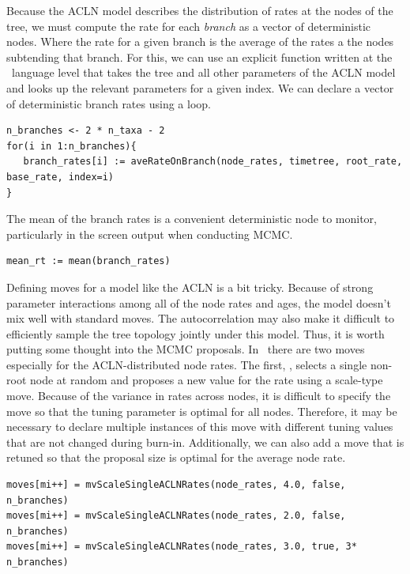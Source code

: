 Because the ACLN model describes the distribution of rates at the nodes of the tree, we must compute the rate for each \textit{branch} as a vector of deterministic nodes. Where the rate for a given branch is the average of the rates a the nodes subtending that branch.
For this, we can use an explicit function written at the \Rev~language level that takes the tree and all other parameters of the ACLN model and looks up the relevant parameters for a given index. 
We can declare a vector of deterministic branch rates using a  loop.
{\tt \begin{snugshade*}
\begin{lstlisting}
n_branches <- 2 * n_taxa - 2
for(i in 1:n_branches){
   branch_rates[i] := aveRateOnBranch(node_rates, timetree, root_rate, base_rate, index=i)
}
\end{lstlisting}
\end{snugshade*}}

The mean of the branch rates is a convenient deterministic node to monitor, particularly in the screen output when conducting MCMC.
{\tt \begin{snugshade*}
\begin{lstlisting}
mean_rt := mean(branch_rates) 
\end{lstlisting}
\end{snugshade*}}

Defining moves for a model like the ACLN is a bit tricky. Because of strong parameter interactions among all of the node rates and ages, the model doesn't mix well with standard moves. 
The autocorrelation may also make it difficult to efficiently sample the tree topology jointly under this model.
Thus, it is worth putting some thought into the MCMC proposals. 
In \RevBayes~there are two moves especially for the ACLN-distributed node rates.
The first, , selects a single non-root node at random and proposes a new value for the rate using a scale-type move. 
Because of the variance in rates across nodes, it is difficult to specify the move so that the tuning parameter is optimal for all nodes. 
Therefore, it may be necessary to declare multiple instances of this move with different tuning values that are not changed during burn-in.
Additionally, we can also add a move that is retuned so that the proposal size is optimal for the average node rate. 
{\tt \begin{snugshade*}
\begin{lstlisting}
moves[mi++] = mvScaleSingleACLNRates(node_rates, 4.0, false, n_branches)
moves[mi++] = mvScaleSingleACLNRates(node_rates, 2.0, false, n_branches)
moves[mi++] = mvScaleSingleACLNRates(node_rates, 3.0, true, 3* n_branches)
\end{lstlisting}
\end{snugshade*}}

